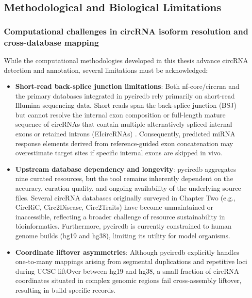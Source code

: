 \subsection{Methodological and Biological Limitations}

\subsubsection{Computational challenges in circRNA isoform resolution and cross-database mapping}
While the computational methodologies developed in this thesis advance circRNA detection and annotation, several limitations must be acknowledged:

\begin{itemize}
    \item \textbf{Short-read back-splice junction limitations}: Both nf-core/circrna and the primary databases integrated in pycircdb rely primarily on short-read Illumina sequencing data. Short reads span the back-splice junction (BSJ) but cannot resolve the internal exon composition or full-length mature sequence of circRNAs that contain multiple alternatively spliced internal exons or retained introns (EIcircRNAs) \cite{CIRI-full, isoCirc}. Consequently, predicted miRNA response elements derived from reference-guided exon concatenation may overestimate target sites if specific internal exons are skipped in vivo.
    
    \item \textbf{Upstream database dependency and longevity}: pycircdb aggregates nine curated resources, but the tool remains inherently dependent on the accuracy, curation quality, and ongoing availability of the underlying source files. Several circRNA databases originally surveyed in Chapter Two (e.g., CircRiC, Circ2Disease, Circ2Traits) have become unmaintained or inaccessible, reflecting a broader challenge of resource sustainability in bioinformatics. Furthermore, pycircdb is currently constrained to human genome builds (hg19 and hg38), limiting its utility for model organisms.

    \item \textbf{Coordinate liftover asymmetries}: Although pycircdb explicitly handles one-to-many mappings arising from segmental duplications and repetitive loci during UCSC liftOver between hg19 and hg38, a small fraction of circRNA coordinates situated in complex genomic regions fail cross-assembly liftover, resulting in build-specific records.
\end{itemize}

